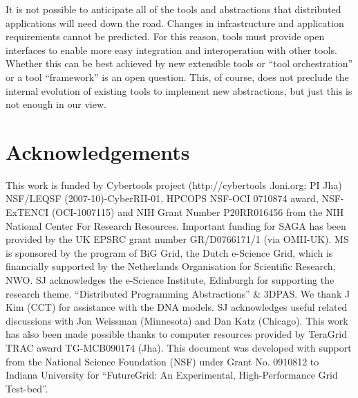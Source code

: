 \documentclass[conference,final]{IEEEtran}
\newcommand{\jhanote}[1]{ {\textcolor{red} { ***shantenu: #1 }}}
\newcommand{\note}[1]{ {\textcolor{magenta} { ***Note: #1 }}}
\newcommand{\jhanote}[1]{}
\newcommand{\note}[1]{}
\newcommand{\up}{\vspace*{-1em}}
\newcommand{\upp}{\vspace*{-0.5em}}
\begin{document}







It is not possible to anticipate all of the tools and abstractions
that distributed applications will need down the road. Changes in
infrastructure and application requirements cannot be predicted. For
this reason, tools must provide open interfaces to enable more easy
integration and interoperation with other tools. Whether this can be
best achieved by new extensible tools or “tool orchestration” or a
tool “framework” is an open question. This, of course, does not
preclude the internal evolution of existing tools to implement new
abstractions, but just this is not enough in our view.






\up
\section*{Acknowledgements\upp\upp}
\footnotesize{This work is funded by Cybertools project
  (http://cybertools .loni.org; PI Jha) NSF/LEQSF
  (2007-10)-CyberRII-01, HPCOPS NSF-OCI 0710874 award, NSF-ExTENCI
  (OCI-1007115) and NIH Grant Number P20RR016456 from the NIH National
  Center For Research Resources. Important funding for SAGA has been
  provided by the UK EPSRC grant number GR/D0766171/1 (via OMII-UK).
  MS is sponsored by the program of BiG Grid, the Dutch e-Science
  Grid, which is financially supported by the Netherlands Organisation
  for Scientific Research, NWO. SJ acknowledges the e-Science
  Institute, Edinburgh for supporting the research
  theme. ``Distributed Programming Abstractions'' \& 3DPAS. We thank J
  Kim (CCT) for assistance with the DNA models.  SJ acknowledges
  useful related discussions with Jon Weissman (Minnesota) and Dan
  Katz (Chicago). This work has also been made possible thanks to
  computer resources provided by TeraGrid TRAC award TG-MCB090174
  (Jha). This document was developed with support from the National
  Science Foundation (NSF) under Grant No.  0910812 to Indiana
  University for ``FutureGrid: An Experimental, High-Performance Grid
  Test-bed''.}
\up
%


\end{document}
